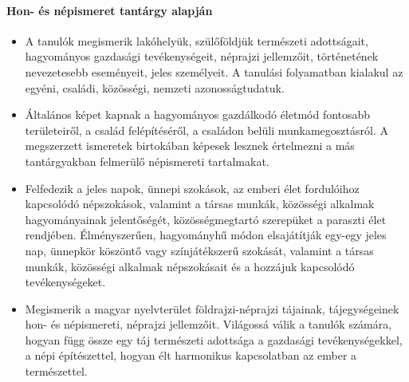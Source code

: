 \paragraph{Hon- és népismeret tantárgy alapján}
\begin{itemize}
\item A tanulók megismerik lakóhelyük, szülőföldjük természeti adottságait, hagyományos gazdasági tevékenységeit, néprajzi jellemzőit, történetének nevezetesebb eseményeit, jeles személyeit. A tanulási folyamatban kialakul az egyéni, családi, közösségi, nemzeti azonosságtudatuk.
\item Általános képet kapnak a hagyományos gazdálkodó életmód fontosabb területeiről, a család felépítéséről, a családon belüli munkamegosztásról. A megszerzett ismeretek birtokában képesek lesznek értelmezni a más tantárgyakban felmerülő népismereti tartalmakat.
\item Felfedezik a jeles napok, ünnepi szokások, az emberi élet fordulóihoz kapcsolódó népszokások, valamint a társas munkák, közösségi alkalmak hagyományainak jelentőségét, közösségmegtartó szerepüket a paraszti élet rendjében. Élményszerűen, hagyományhű módon elsajátítják egy-egy jeles nap, ünnepkör köszöntő vagy színjátékszerű szokását, valamint a társas munkák, közösségi alkalmak népszokásait és a hozzájuk kapcsolódó tevékenységeket.
\item Megismerik a magyar nyelvterület földrajzi-néprajzi tájainak, tájegységeinek hon- és népismereti, néprajzi jellemzőit. Világossá válik a tanulók számára, hogyan függ össze egy táj természeti adottsága a gazdasági tevékenységekkel, a népi építészettel, hogyan élt harmonikus kapcsolatban az ember a természettel.
\end{itemize}
